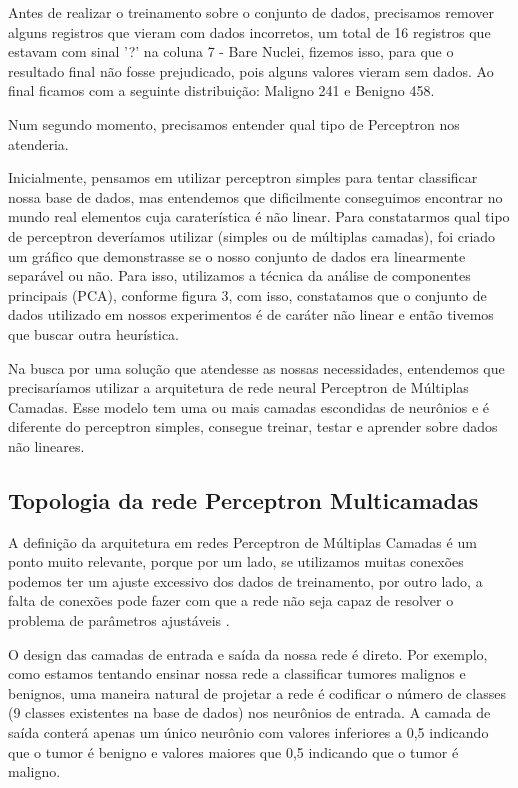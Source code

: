 \documentclass[conference]{IEEEtran}
\begin{document}
    Antes de realizar o treinamento sobre o conjunto de dados, precisamos remover alguns registros que vieram com dados incorretos, um total de 16 registros que estavam com sinal '?' na coluna 7 - Bare Nuclei, fizemos isso, para que o resultado final não fosse prejudicado, pois alguns valores vieram sem dados. Ao final ficamos com a seguinte distribuição: Maligno 241 e Benigno 458.
    
    Num segundo momento, precisamos entender qual tipo de Perceptron nos atenderia. 
    
    Inicialmente, pensamos em utilizar perceptron simples para tentar classificar nossa base de dados, mas entendemos que dificilmente conseguimos encontrar no mundo real elementos cuja caraterística é não linear. Para constatarmos qual tipo de perceptron deveríamos utilizar (simples ou de múltiplas camadas), foi criado um gráfico que demonstrasse se o nosso conjunto de dados era linearmente separável ou não. Para isso, utilizamos a técnica da análise de componentes principais (PCA), conforme figura 3, com isso, constatamos que o conjunto de dados utilizado em nossos experimentos é de caráter não linear e então tivemos que buscar outra heurística.
    
    Na busca por uma solução que atendesse as nossas necessidades, entendemos que precisaríamos utilizar a arquitetura de rede neural Perceptron de Múltiplas Camadas. Esse modelo tem uma ou mais camadas escondidas de neurônios e é diferente do perceptron simples, consegue treinar, testar e aprender sobre dados não lineares.
    
    \subsection{Topologia da rede Perceptron Multicamadas}
    
    A definição da arquitetura em redes Perceptron de Múltiplas Camadas é um ponto muito relevante, porque por um lado, se utilizamos muitas conexões podemos ter um ajuste excessivo dos dados de treinamento, por outro lado, a falta de conexões pode fazer com que a rede não seja capaz de resolver o problema de parâmetros ajustáveis \cite{b7}.

    O design das camadas de entrada e saída da nossa rede é direto. Por exemplo, como estamos tentando ensinar nossa rede a classificar tumores malignos e benignos, uma maneira natural de projetar a rede é codificar o número de classes (9 classes existentes na base de dados) nos neurônios de entrada. A camada de saída conterá apenas um único neurônio com valores inferiores a 0,5 indicando que  o tumor é benigno e valores maiores que 0,5 indicando que o tumor é maligno.
    
\end{document}
